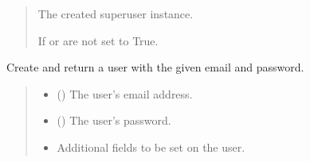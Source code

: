 \documentclass[letterpaper,10pt,english]{sphinxmanual}
\begin{document}
\begin{fulllineitems}
\begin{fulllineitems}
\begin{quote}
\begin{description}
\begin{itemize}
\end{itemize}

\sphinxAtStartPar
The created superuser instance.

\sphinxAtStartPar
{\hyperref[\detokenize{users:users.models.CustomUser}]{}}

\sphinxAtStartPar
{} \textendash{} If  or  are not set to True.

\end{description}\end{quote}

\end{fulllineitems}


\begin{fulllineitems}
\label{\detokenize{users:users.models.CustomUserManager.create_user}}
\pysigstartsignatures
\pysiglinewithargsret
{}
{\sphinxparamcomma {}\sphinxparamcomma {}}
{}
\pysigstopsignatures
\sphinxAtStartPar
Create and return a user with the given email and password.
\begin{quote}\begin{description}
\begin{itemize}
\item {} 
\sphinxAtStartPar
{} () \textendash{} The user’s email address.

\item {} 
\sphinxAtStartPar
{} (\sphinxstyleliteralemphasis{\sphinxupquote{, }}) \textendash{} The user’s password.

\item {} 
\sphinxAtStartPar
{} \textendash{} Additional fields to be set on the user.


\end{itemize}
\end{description}
\end{quote}
\end{fulllineitems}
\end{fulllineitems}
\end{document}

